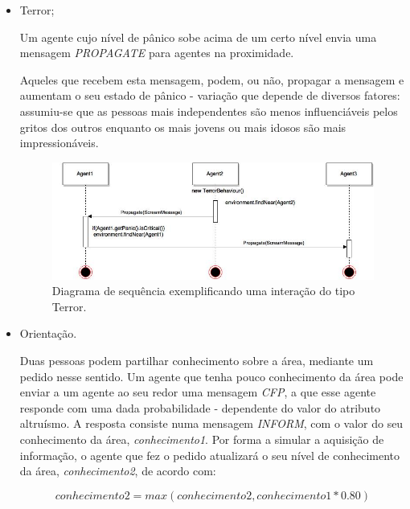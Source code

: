 \documentclass[12pt]{article}
\begin{document}
\begin{titlepage}
\begin{itemize}

\item Terror;

Um agente cujo nível de pânico sobe acima de um certo nível envia uma mensagem \textit{PROPAGATE} para agentes na proximidade.

Aqueles que recebem esta mensagem, podem, ou não, propagar a mensagem e aumentam o seu estado de pânico - variação que depende de diversos fatores: assumiu-se que as pessoas mais independentes são menos influenciáveis pelos gritos dos outros enquanto os mais jovens ou mais idosos são mais impressionáveis.\newline



\begin{figure}[H]
	\centering
	\includegraphics[scale=0.5]{terror-behaviour.jpg}
	\caption{Diagrama de sequência exemplificando uma interação do tipo Terror.}
	\label{uml}
\end{figure}

\item Orientação.

Duas pessoas podem partilhar conhecimento sobre a área, mediante um pedido nesse sentido. Um agente que tenha pouco conhecimento da área pode enviar a um agente ao seu redor uma mensagem \textit{CFP}, a que esse agente responde com uma dada probabilidade - dependente do valor do atributo altruísmo. A resposta consiste numa mensagem \textit{INFORM}, com o valor do seu conhecimento da área, \textit{conhecimento1}. Por forma a simular a aquisição de informação, o agente que fez o pedido atualizará o seu nível de conhecimento da área, \textit{conhecimento2}, de acordo com:

\[	conhecimento2 = max(conhecimento2, conhecimento1 * 0.80) \]


\end{itemize}
\end{titlepage}
\end{document}
